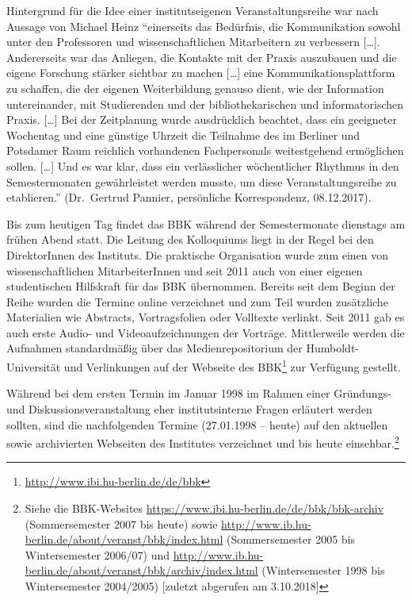 \documentclass[a4paper,
fontsize=11pt,
oneside,
numbers=noperiodatend,
parskip=half-,
bibliography=totoc,
final
]{scrartcl}
\begin{document}
Hintergrund für die Idee einer institutseigenen Veranstaltungsreihe war
nach Aussage von Michael Heinz \enquote{einerseits das Bedürfnis, die
Kommunikation sowohl unter den Professoren und wissenschaftlichen
Mitarbeitern zu verbessern {[}\ldots{}{]}. Andererseits war das Anliegen, die
Kontakte mit der Praxis auszubauen und die eigene Forschung stärker
sichtbar zu machen {[}\ldots{}{]} eine Kommunikationsplattform zu
schaffen, die der eigenen Weiterbildung genauso dient, wie der
Information untereinander, mit Studierenden und der bibliothekarischen
und informatorischen Praxis. {[}\ldots{}{]} Bei der Zeitplanung wurde
ausdrücklich beachtet, dass ein geeigneter Wochentag und eine günstige
Uhrzeit die Teilnahme des im Berliner und Potsdamer Raum reichlich
vorhandenen Fachpersonals weitestgehend ermöglichen sollen.
{[}\ldots{}{]} Und es war klar, dass ein verlässlicher wöchentlicher
Rhythmus in den Semestermonaten gewährleistet werden musste, um diese
Veranstaltungsreihe zu etablieren.} (Dr.~Gertrud Pannier, persönliche
Korrespondenz, 08.12.2017).

Bis zum heutigen Tag findet das BBK während der Semestermonate dienstags
am frühen Abend statt. Die Leitung des Kolloquiums liegt in der Regel
bei den DirektorInnen des Instituts. Die praktische Organisation wurde
zum einen von wissenschaftlichen MitarbeiterInnen und seit 2011 auch von
einer eigenen studentischen Hilfskraft für das BBK übernommen. Bereits
seit dem Beginn der Reihe wurden die Termine online verzeichnet und zum
Teil wurden zusätzliche Materialien wie Abstracts, Vortragsfolien oder
Volltexte verlinkt. Seit 2011 gab es auch erste Audio- und
Videoaufzeichnungen der Vorträge. Mittlerweile werden die Aufnahmen
standardmäßig über das Medienrepositorium der Humboldt-Universität und
Verlinkungen auf der Webseite des BBK\footnote{\href{http://www.ibi.hu-berlin.de/de/bbk}{http://www.ibi.hu-berlin.de/de/bbk}}
zur Verfügung gestellt.

Während bei dem ersten Termin im Januar 1998 im Rahmen einer Gründungs-
und Diskussionsveranstaltung eher institutsinterne Fragen erläutert
werden sollten, sind die nachfolgenden Termine (27.01.1998 -- heute) auf
den aktuellen sowie archivierten Webseiten des Institutes verzeichnet
und bis heute einsehbar.\footnote{Siehe die BBK-Websites
  \url{https://www.ibi.hu-berlin.de/de/bbk/bbk-archiv} (Sommersemester
  2007 bis heute) sowie
  \url{http://www.ib.hu-berlin.de/about/veranst/bbk/index.html}
  (Sommersemester 2005 bis Wintersemester 2006/07) und
  \url{http://www.ib.hu-berlin.de/about/veranst/bbk/archiv/index.html}
  (Wintersemester 1998 bis Wintersemester 2004/2005) {[}zuletzt
  abgerufen am 3.10.2018{]}}
\end{document}
